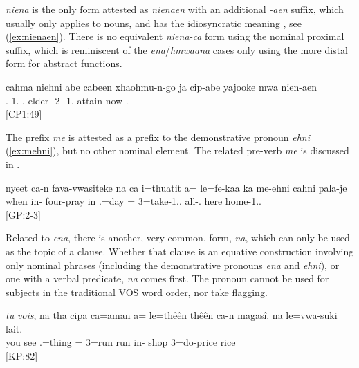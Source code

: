 \textit{niena}  is the only form attested as \textit{nienaen} with an additional \textit{-aen}  suffix, which usually only applies to nouns, and has the idiosyncratic meaning , see (\ref{ex:nienaen}). There is no equivalent \textit{niena-ca} form using the nominal proximal suffix, which is reminiscent of the \textit{ena}\slash\textit{hmwaana} cases only using the more distal form for abstract functions.


\ea \label{ex:nienaen}
\gll cahma niehni abe cabeen xhaohmu-n-go ja cip-abe yajooke mwa nien-aen\\
  . 1. . elder--2  -1. attain now .-\\
\glt {} {[CP1:49]}
\z



\label{ssec:mehni}

The prefix \textit{me}  is attested as a prefix to the demonstrative pronoun \textit{ehni} (\ref{ex:mehni}), but no other nominal element. The related pre-verb \textit{me} is discussed in .

\ea \label{ex:mehni}
\gll nyeet ca-n fava-vwasiteke na ca i=thuatit a= le=fe-kaa ka me-ehni cahni pala-je\\
 when in- four-pray  in .=day = 3=take-1..  all-. here home-1..\\
\glt {} {[GP:2-3]}
\z 

Related to \textit{ena}, there is another, very common, form, \textit{na}, which can only be used as the topic of a clause. Whether that clause is an equative construction involving only nominal phrases (including the demonstrative pronouns \textit{ena} and \textit{ehni}), or one with a verbal predicate, \textit{na} comes first. The pronoun cannot be used for subjects in the traditional VOS word order, nor take flagging. 

\ea
\gll  ‎‎\textit{tu} \textit{vois}, na tha cipa ca=aman a= le=thêên thêên ca-n magasî. na le=vwa-suki lait.\\
 you see    .=thing = 3=run run in- shop  3=do-price rice\\
\glt {} {[KP:82]}
\z

